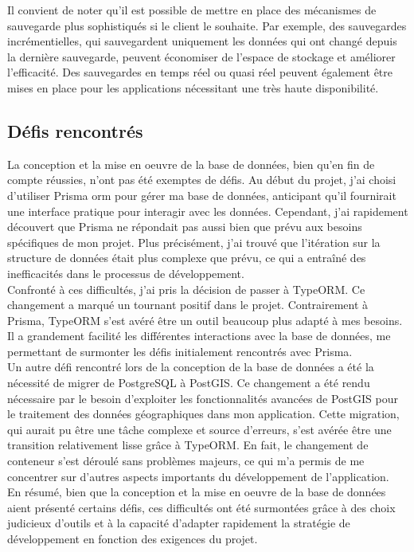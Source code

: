 Il convient de noter qu'il est possible de mettre en place des mécanismes de sauvegarde plus sophistiqués si le client le souhaite.
Par exemple, des sauvegardes incrémentielles, qui sauvegardent uniquement les données qui ont changé depuis la dernière sauvegarde, peuvent économiser de l'espace de stockage et améliorer l'efficacité.
Des sauvegardes en temps réel ou quasi réel peuvent également être mises en place pour les applications nécessitant une très haute disponibilité.\\

\subsection{Défis rencontrés}\label{subsec:challenges}
La conception et la mise en oeuvre de la base de données, bien qu'en fin de compte réussies, n'ont pas été exemptes de défis.
Au début du projet, j'ai choisi d'utiliser Prisma \Gls{orm} pour gérer ma base de données, anticipant qu'il fournirait une interface pratique pour interagir avec les données.
Cependant, j'ai rapidement découvert que Prisma ne répondait pas aussi bien que prévu aux besoins spécifiques de mon projet.
Plus précisément, j'ai trouvé que l'itération sur la structure de données était plus complexe que prévu, ce qui a entraîné des inefficacités dans le processus de développement.\\

Confronté à ces difficultés, j'ai pris la décision de passer à TypeORM. Ce changement a marqué un tournant positif dans le projet.
Contrairement à Prisma, TypeORM s'est avéré être un outil beaucoup plus adapté à mes besoins.
Il a grandement facilité les différentes interactions avec la base de données, me permettant de surmonter les défis initialement rencontrés avec Prisma.\\

Un autre défi rencontré lors de la conception de la base de données a été la nécessité de migrer de PostgreSQL à PostGIS.
Ce changement a été rendu nécessaire par le besoin d'exploiter les fonctionnalités avancées de PostGIS pour le traitement des données géographiques dans mon application.
Cette migration, qui aurait pu être une tâche complexe et source d'erreurs, s'est avérée être une transition relativement lisse grâce à TypeORM. En fait,
le changement de conteneur s'est déroulé sans problèmes majeurs, ce qui m'a permis de me concentrer sur d'autres aspects importants du développement de l'application.\\

En résumé, bien que la conception et la mise en oeuvre de la base de données aient présenté certains défis,
ces difficultés ont été surmontées grâce à des choix judicieux d'outils et à la capacité d'adapter rapidement la stratégie
de développement en fonction des exigences du projet.\\